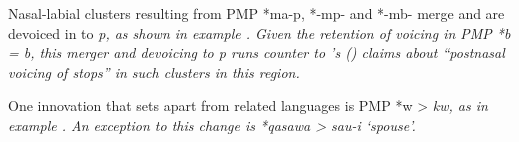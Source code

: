 Nasal-labial clusters resulting from PMP *ma-p,
*-mp- and *-mb- merge
and are devoiced in  to \it{p},
as shown in example .
Given the retention of voicing in PMP *b = \it{b},
this merger and devoicing to \it{p} runs
counter to \citeauthor{Blust2009}’s (\citeyear[72]{Blust2009})
claims about “postnasal voicing of stops” in such clusters
in this region.


One innovation that sets  apart
from related languages is
PMP *w > \it{kw},
as in example .
An exception to this change
is *qasawa > \it{sau-i} ‘spouse’.
\mbox{}\\

